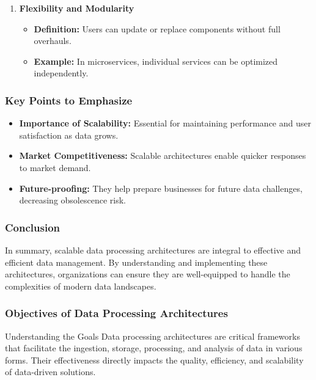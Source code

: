 \documentclass[aspectratio=169]{beamer}
\begin{document}
\begin{frame}[fragile]
\begin{enumerate}
        \item \textbf{Flexibility and Modularity}
            \begin{itemize}
                \item \textbf{Definition:} Users can update or replace components without full overhauls.
                \item \textbf{Example:} In microservices, individual services can be optimized independently.
            \end{itemize}
    \end{enumerate}
\end{frame}

\begin{frame}[fragile]
    \frametitle{Key Points to Emphasize}
    \begin{itemize}
        \item \textbf{Importance of Scalability:} Essential for maintaining performance and user satisfaction as data grows.
        \item \textbf{Market Competitiveness:} Scalable architectures enable quicker responses to market demand.
        \item \textbf{Future-proofing:} They help prepare businesses for future data challenges, decreasing obsolescence risk.
    \end{itemize}
\end{frame}

\begin{frame}[fragile]
    \frametitle{Conclusion}
    In summary, scalable data processing architectures are integral to effective and efficient data management. By understanding and implementing these architectures, organizations can ensure they are well-equipped to handle the complexities of modern data landscapes.
\end{frame}

\begin{frame}[fragile]
    \frametitle{Objectives of Data Processing Architectures}
    \begin{block}{Understanding the Goals}
        Data processing architectures are critical frameworks that facilitate the ingestion, storage, processing, and analysis of data in various forms. Their effectiveness directly impacts the quality, efficiency, and scalability of data-driven solutions.
    \end{block}
\end{frame}
\end{document}
